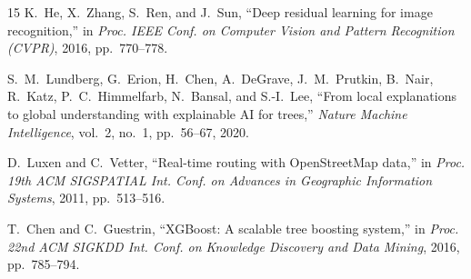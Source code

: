 \documentclass{article}
\begin{document}
\begin{thebibliography}{15}
K.~He, X.~Zhang, S.~Ren, and J.~Sun, ``Deep residual learning for image recognition,'' in \textit{Proc. IEEE Conf. on Computer Vision and Pattern Recognition (CVPR)}, 2016, pp.~770--778.

S.~M.~Lundberg, G.~Erion, H.~Chen, A.~DeGrave, J.~M.~Prutkin, B.~Nair, R.~Katz, P.~C.~Himmelfarb, N.~Bansal, and S.-I.~Lee, ``From local explanations to global understanding with explainable AI for trees,'' \textit{Nature Machine Intelligence}, vol.~2, no.~1, pp.~56--67, 2020.

D.~Luxen and C.~Vetter, ``Real-time routing with OpenStreetMap data,'' in \textit{Proc. 19th ACM SIGSPATIAL Int. Conf. on Advances in Geographic Information Systems}, 2011, pp.~513--516.

T.~Chen and C.~Guestrin, ``XGBoost: A scalable tree boosting system,'' in \textit{Proc. 22nd ACM SIGKDD Int. Conf. on Knowledge Discovery and Data Mining}, 2016, pp.~785--794.

\end{thebibliography}
\end{document}

